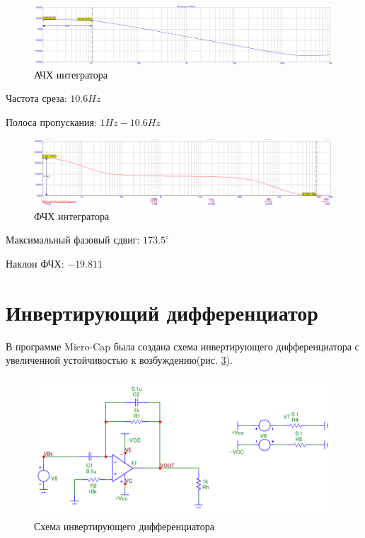\documentclass[a4paper,14pt]{article}
\begin{document}
\begin{figure}[H]
	\centering
	\includegraphics[width=\linewidth]{../imgs/int_fr}
	\caption{АЧХ интегратора}
	\label{fig:int_fr}
\end{figure}


Частота среза: $10.6Hz$

Полоса пропускания: $1Hz - 10.6Hz$

\begin{figure}[H]
	\centering
	\includegraphics[width=\linewidth]{../imgs/int_pr}
	\caption{ФЧХ интегратора}
	\label{fig:int_pr}
\end{figure}

Максимальный фазовый сдвиг: $173.5^{\circ}$

Наклон ФЧХ: $-19.811$

\section{Инвертирующий дифференциатор}

В программе Micro-Cap была создана схема инвертирующего дифференциатора с увеличенной устойчивостью к возбуждению(рис. \ref{fig:schema_diff}).

\begin{figure}[H]
	\centering
	\includegraphics[width=\linewidth]{../imgs/schema_diff}
	\caption{Схема инвертирующего дифференциатора}
	\label{fig:schema_diff}
\end{figure}
\end{document}
